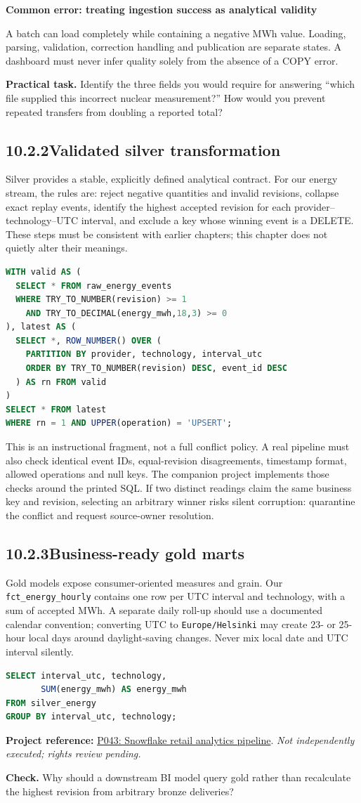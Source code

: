 \documentclass[11pt,twoside]{article}
\newcommand{\topic}[2]{\subsection*{#1\quad #2}}
\newcommand{\repo}[2]{\par\begingroup\fontsize{8.0}{9.6}\selectfont\sffamily\color{inkgray}\textbf{Project reference:} \href{#2}{#1}. \textit{Not independently executed; rights review pending.}\par\endgroup}
\begin{document}
\begin{insight}\textbf{Common error: treating ingestion success as analytical validity}\par
A batch can load completely while containing a negative MWh value. Loading, parsing, validation, correction handling and publication are separate states. A dashboard must never infer quality solely from the absence of a COPY error.\end{insight}
\textbf{Practical task.} Identify the three fields you would require for answering ``which file supplied this incorrect nuclear measurement?'' How would you prevent repeated transfers from doubling a reported total?
\newpage
\topic{10.2.2}{Validated silver transformation}
Silver provides a stable, explicitly defined analytical contract. For our energy stream, the rules are: reject negative quantities and invalid revisions, collapse exact replay events, identify the highest accepted revision for each provider--technology--UTC interval, and exclude a key whose winning event is a DELETE. These steps must be consistent with earlier chapters; this chapter does not quietly alter their meanings.
\begin{lstlisting}[language=SQL,caption={Core revision-resolution pattern; abbreviated for print.}]
WITH valid AS (
  SELECT * FROM raw_energy_events
  WHERE TRY_TO_NUMBER(revision) >= 1
    AND TRY_TO_DECIMAL(energy_mwh,18,3) >= 0
), latest AS (
  SELECT *, ROW_NUMBER() OVER (
    PARTITION BY provider, technology, interval_utc
    ORDER BY TRY_TO_NUMBER(revision) DESC, event_id DESC
  ) AS rn FROM valid
)
SELECT * FROM latest
WHERE rn = 1 AND UPPER(operation) = 'UPSERT';
\end{lstlisting}
This is an instructional fragment, not a full conflict policy. A real pipeline must also check identical event IDs, equal-revision disagreements, timestamp format, allowed operations and null keys. The companion project implements those checks around the printed SQL. If two distinct readings claim the same business key and revision, selecting an arbitrary winner risks silent corruption: quarantine the conflict and request source-owner resolution.
\topic{10.2.3}{Business-ready gold marts}
Gold models expose consumer-oriented measures and grain. Our \texttt{fct\_energy\_hourly} contains one row per UTC interval and technology, with a sum of accepted MWh. A separate daily roll-up should use a documented calendar convention; converting UTC to \texttt{Europe/Helsinki} may create 23- or 25-hour local days around daylight-saving changes. Never mix local date and UTC interval silently.
\begin{lstlisting}[language=SQL,caption={A gold measure with explicit grain.}]
SELECT interval_utc, technology,
       SUM(energy_mwh) AS energy_mwh
FROM silver_energy
GROUP BY interval_utc, technology;
\end{lstlisting}
\repo{P043: Snowflake retail analytics pipeline}{https://github.com/Snowflake-Labs/sfguide-building-retail-analytics-de-pipeline}
\textbf{Check.} Why should a downstream BI model query gold rather than recalculate the highest revision from arbitrary bronze deliveries?
\newpage
\end{document}
